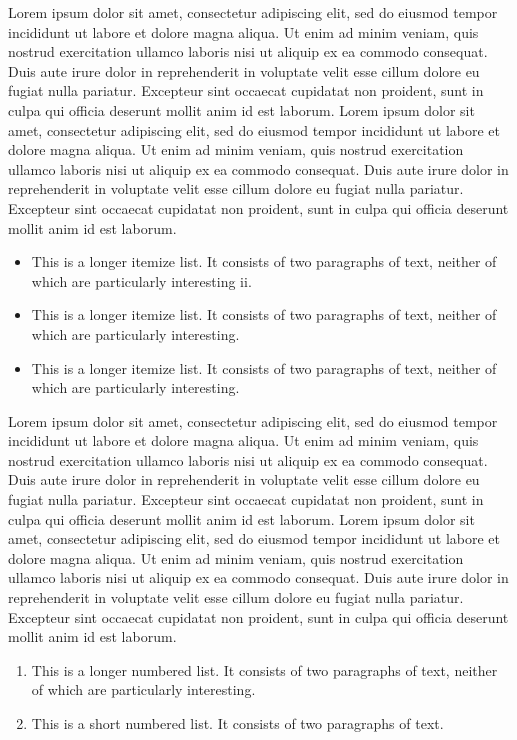 \documentclass[english]{sbc2025}%
\begin{document}
Lorem ipsum dolor sit amet, consectetur adipiscing elit, sed do eiusmod tempor incididunt ut labore et dolore magna aliqua. Ut enim ad minim veniam, quis nostrud exercitation ullamco laboris nisi ut aliquip ex ea commodo consequat. Duis aute irure dolor in reprehenderit in voluptate velit esse cillum dolore eu fugiat nulla pariatur. Excepteur sint occaecat cupidatat non proident, sunt in culpa qui officia deserunt mollit anim id est laborum. Lorem ipsum dolor sit amet, consectetur adipiscing elit, sed do eiusmod tempor incididunt ut labore et dolore magna aliqua. Ut enim ad minim veniam, quis nostrud exercitation ullamco laboris nisi ut aliquip ex ea commodo consequat. Duis aute irure dolor in reprehenderit in voluptate velit esse cillum dolore eu fugiat nulla pariatur. Excepteur sint occaecat cupidatat non proident, sunt in culpa qui officia deserunt mollit anim id est laborum.

\begin{itemize}
\item This is a longer itemize list. It consists of two paragraphs of text, neither of which are particularly interesting {\sc ii}.
\item This is a longer itemize list. It consists of two paragraphs of text, neither of which are particularly interesting.
\item This is a longer itemize list. It consists of two paragraphs of text, neither of which are particularly interesting.
\end{itemize}

Lorem ipsum dolor sit amet, consectetur adipiscing elit, sed do eiusmod tempor incididunt ut labore et dolore magna aliqua. Ut enim ad minim veniam, quis nostrud exercitation ullamco laboris nisi ut aliquip ex ea commodo consequat. Duis aute irure dolor in reprehenderit in voluptate velit esse cillum dolore eu fugiat nulla pariatur. Excepteur sint occaecat cupidatat non proident, sunt in culpa qui officia deserunt mollit anim id est laborum. Lorem ipsum dolor sit amet, consectetur adipiscing elit, sed do eiusmod tempor incididunt ut labore et dolore magna aliqua. Ut enim ad minim veniam, quis nostrud exercitation ullamco laboris nisi ut aliquip ex ea commodo consequat. Duis aute irure dolor in reprehenderit in voluptate velit esse cillum dolore eu fugiat nulla pariatur. Excepteur sint occaecat cupidatat non proident, sunt in culpa qui officia deserunt mollit anim id est laborum.

\begin{enumerate}%
\item This is a longer numbered list. It consists of two paragraphs of text, neither of which are particularly interesting.
\item This is a short numbered list. It consists of two paragraphs of text.
\end{enumerate}
\end{document}
